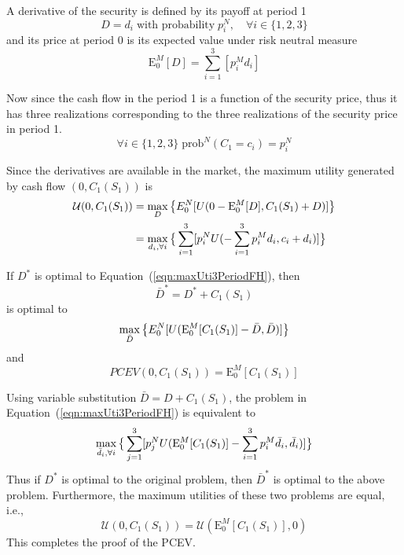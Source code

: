 \documentclass{article}[12pt letter]
\newcommand{\E}{\mathrm{E}}
\begin{document}
 A derivative of the security is defined by its payoff at period 1
 \[D =d_i \; \text{with probability} \; p_i^N, \quad \forall i\in\{1,2,3\}\]
 and its price at period 0 is its expected value under risk neutral measure
 \[\E_0^M[D] = \sum_{i=1}^3[p_i^M d_i] \]
 
 
 Now since the cash flow in the period 1 is a function of the security price, thus it has three realizations corresponding to the three realizations of the security price in period 1. 
 \[ \forall i \in \{1, 2, 3\} \; \text{prob}^N(C_1 = c_i) = p_i^N \]
 
 
Since the derivatives are available in the market, the maximum utility generated by cash flow $(0,C_1(S_1))$ is
\begin{align}
\mathcal{U}(0,C_1(S_1))&= \max_{D}\big{\{} E_0^N [U(0-\E_0^M[D], C_1(S_1) + D)]\big{ \}}\nonumber \\
& = \max_{d_i, \forall i} \big{\{}\sum_{i=1}^3 [p_i^N U(-\sum_{i=1}^3 p_i^M d_i, c_i + d_i)]\big{ \}} \label{eqn:maxUti3PeriodFH}
\end{align}

{\lemma If $D^*$ is optimal to Equation~(\ref{eqn:maxUti3PeriodFH}), then
\[\bar{D}^* = D^* + C_1(S_1) \] 
is optimal to 
\[ \max_{\bar{D}} \big{\{} E_0^N [U(\E_0^M[C_1(S_1)]-\bar{D},  \bar{D} )]\big{ \}} \]
and
\[PCEV(0, C_1(S_1)) = \E_0^M[C_1(S_1)]\]
} 

\proof Using variable substitution $\bar{D} = D + C_1(S_1)$, the problem in Equation~(\ref{eqn:maxUti3PeriodFH}) is equivalent to
\[\max_{\bar{d}_i, \forall i} \big{\{}\sum_{j=1}^3 [p_j^N U(\E_0^M[C_1(S_1)]-\sum_{i=1}^3 p_i^M \bar{d}_i, \bar{d}_i)]\big{ \}} \]
Thus if $D^*$ is optimal to the original problem, then $\bar{D}^*$ is optimal to the above problem. Furthermore, the maximum utilities of these two problems are equal, i.e.,
\[\mathcal{U}(0, C_1(S_1)) = \mathcal{U} (\E_0^M[C_1(S_1)],0) \]
This completes the proof of the PCEV. 
\endproof









\newpage

%
\end{document}
